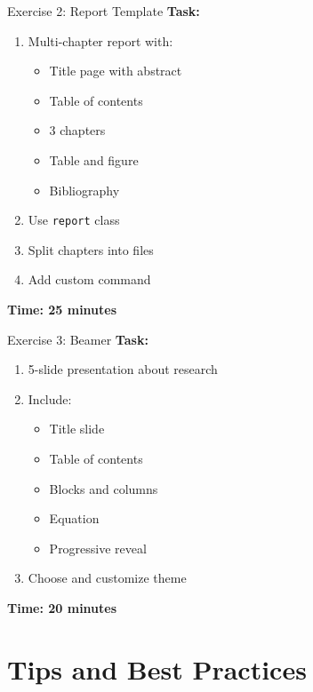 \documentclass[aspectratio=169]{beamer}
\begin{document}
	\begin{frame}{Exercise 2: Report Template}
		\textbf{Task:}
		\begin{enumerate}
			\item Multi-chapter report with:
			\begin{itemize}
				\item Title page with abstract
				\item Table of contents
				\item 3 chapters
				\item Table and figure
				\item Bibliography
			\end{itemize}
			\item Use \texttt{report} class
			\item Split chapters into files
			\item Add custom command
		\end{enumerate}
		
		\vspace{1em}
		\textbf{Time: 25 minutes}
	\end{frame}
	
	\begin{frame}{Exercise 3: Beamer}
		\textbf{Task:}
		\begin{enumerate}
			\item 5-slide presentation about research
			\item Include:
			\begin{itemize}
				\item Title slide
				\item Table of contents
				\item Blocks and columns
				\item Equation
				\item Progressive reveal
			\end{itemize}
			\item Choose and customize theme
		\end{enumerate}
		
		\vspace{1em}
		\textbf{Time: 20 minutes}
	\end{frame}
	
	\section{Tips and Best Practices}
	
\end{document}
